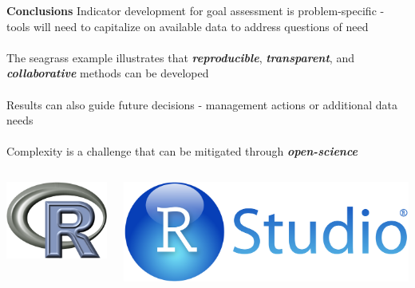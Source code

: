 \documentclass[serif]{beamer}\usepackage[]{graphicx}\usepackage[]{color}
\newcommand{\emtxt}[1]{\textbf{\textit{#1}}}
\begin{document}
\begin{frame}{\textbf{Conclusions}}
Indicator development for goal assessment is problem-specific - tools will need to capitalize on available data to address questions of need \\~\\
The seagrass example illustrates that \emtxt{reproducible}, \emtxt{transparent}, and \emtxt{collaborative} methods can be developed \\~\\
Results can also guide future decisions - management actions or additional data needs \\~\\
Complexity is a challenge that can be mitigated through \emtxt{open-science}
\begin{columns}
\begin{column}{0.2\textwidth}
\centerline{\includegraphics[width = \textwidth]{fig/Rlogo.png}}
\end{column}
\begin{column}{0.2\textwidth}
\centerline{\includegraphics[width = \textwidth]{fig/RStudio.png}}
\end{column}

\end{columns}
\end{frame}
\end{document}
